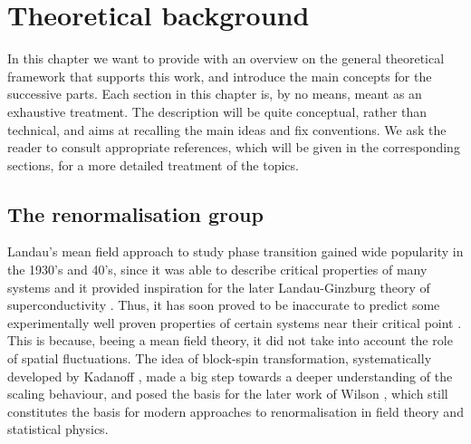 \chapter{Theoretical background}
\label{chap:background}
In this chapter we want to provide with an overview on the general theoretical framework that supports this work, and introduce the main concepts for the successive parts. Each section in this chapter is, by no means, meant as an exhaustive treatment. The description will be quite conceptual, rather than technical, and aims at recalling the main ideas and fix conventions. We ask the reader to consult appropriate references,  which will be given in the corresponding sections, for a more detailed treatment of the topics. \\

\section{The renormalisation group}
Landau's mean field approach to study phase transition \cite{Landau:1937obd} gained wide popularity in the 1930's and 40's, since it was able to describe critical properties of many systems and it provided inspiration for the later Landau-Ginzburg theory of superconductivity \cite{ginzburg}. Thus, it has soon proved to be inaccurate to predict some experimentally well proven properties of certain systems near their critical point \cite{Cao:1999pw}. This is because, beeing a mean field theory, it did not take into account the role of spatial fluctuations.
The idea of block-spin transformation, systematically developed by Kadanoff \cite{PhysicsPhysiqueFizika_2_263}, made a big step towards a deeper understanding of the scaling behaviour, and posed the basis for the later work of Wilson \cite{WilsonRG1,WilsonRG2,WilsonFisher}, which still constitutes the basis for modern approaches to renormalisation in field theory and statistical physics.\\

